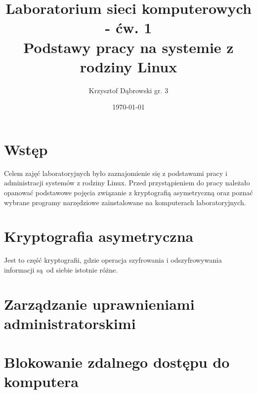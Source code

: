 \documentclass{article}
\title{Laboratorium sieci komputerowych - ćw. 1 \\ Podstawy pracy na systemie z rodziny Linux}
\author{Krzysztof Dąbrowski gr. 3}
\date{\today}
\begin{document}
\maketitle{}
\tableofcontents{}
\newpage

\section{Wstęp}
Celem zajęć laboratoryjnych było zaznajomienie się z podstawami pracy i administracji systemów z rodziny Linux. Przed przystąpieniem do pracy należało opanować podstawowe pojęcia związanie z kryptografią asymetryczną oraz poznać wybrane programy narzędziowe zainstalowane na komputerach laboratoryjnych.

\section{Kryptografia asymetryczna}
Jest to część kryptografii, gdzie operacja szyfrowania i odszyfrowywania informacji są od siebie istotnie różne.

\section{Zarządzanie uprawnieniami administratorskimi}

\section{Blokowanie zdalnego dostępu do komputera}
\end{document}
